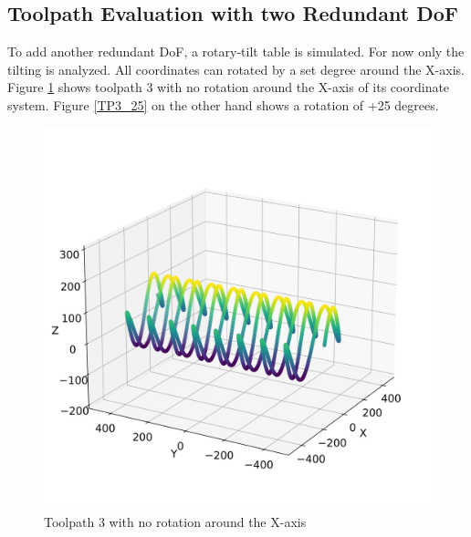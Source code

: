 \subsection{Toolpath Evaluation with two Redundant DoF}

To add another redundant DoF, a rotary-tilt table is simulated. For now only the tilting is analyzed. All coordinates can rotated by a set degree around the X-axis. Figure \ref{TP3_0} shows toolpath 3 with no rotation around the X-axis of its coordinate system. Figure \ref{TP3_25} on the other hand shows a rotation of +25 degrees.
\begin{figure}[H]%
	\centering
	\begin{minipage}{0.5\textwidth}
		\includegraphics[width=\textwidth]{figures/path3_kipp_0.png}
		\caption{Toolpath 3 with no rotation around the X-axis}
		\label{TP3_0}
	\end{minipage}\hfill
	\begin{minipage}{0.5\textwidth}

\end{minipage}
\end{figure}
